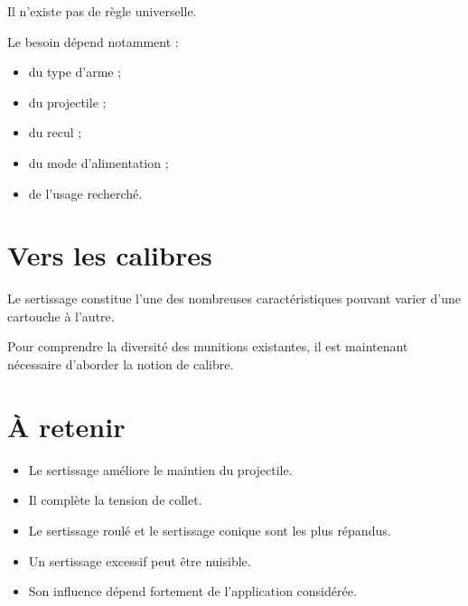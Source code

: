 Il n'existe pas de règle universelle.

Le besoin dépend notamment :

\begin{itemize}
    \item du type d'arme ;
    \item du projectile ;
    \item du recul ;
    \item du mode d'alimentation ;
    \item de l'usage recherché.
\end{itemize}

\section{Vers les calibres}

Le sertissage constitue l'une des nombreuses caractéristiques pouvant varier
d'une cartouche à l'autre.

Pour comprendre la diversité des munitions existantes, il est maintenant
nécessaire d'aborder la notion de calibre.

\section{À retenir}

\begin{aretenir}

\begin{itemize}
    \item Le sertissage améliore le maintien du projectile.
    \item Il complète la tension de collet.
    \item Le sertissage roulé et le sertissage conique sont les plus répandus.
    \item Un sertissage excessif peut être nuisible.
    \item Son influence dépend fortement de l'application considérée.
\end{itemize}

\end{aretenir}
